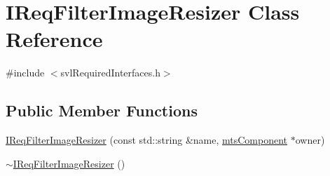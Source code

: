 \hypertarget{class_i_req_filter_image_resizer}{\section{I\-Req\-Filter\-Image\-Resizer Class Reference}
\label{class_i_req_filter_image_resizer}
}


{\ttfamily \#include $<$svl\-Required\-Interfaces.\-h$>$}

\subsection*{Public Member Functions}
\begin{DoxyCompactItemize}
\item 
\hyperlink{class_i_req_filter_image_resizer_ac431364f9a74a86ba92f433e116dbd8f}{I\-Req\-Filter\-Image\-Resizer} (const std\-::string \&name, \hyperlink{classmts_component}{mts\-Component} $\ast$owner)
\item 
\hyperlink{class_i_req_filter_image_resizer_a5af76402bd0fe8bc1b28a61942215222}{$\sim$\-I\-Req\-Filter\-Image\-Resizer} ()
\end{DoxyCompactItemize}
